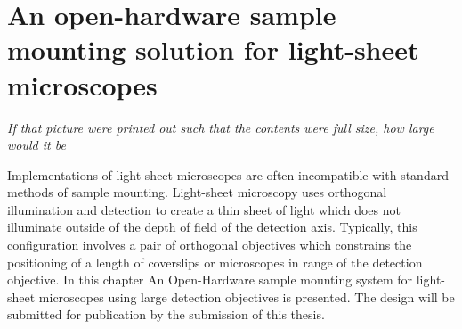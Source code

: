 \ifpdf
    \graphicspath{{Chapters/chamber/Figs/Raster/}{Chapters/chamber/Figs/PDF/}{Chapters/chamber/Figs/}}
\else
    \graphicspath{{Chapters/chamber/Figs/Vector/}{Chapters/chamber/Figs/}}
\fi


\chapter{An open-hardware sample mounting solution for light-sheet microscopes}\label{chapter:chamber}
\epigraph{\emph{If that picture were printed out such that the contents were full size, how large would it be}}{}

Implementations of light-sheet microscopes are often incompatible with standard methods of sample mounting.
Light-sheet microscopy uses orthogonal illumination and detection to create a thin sheet of light which does not illuminate outside of the depth of field of the detection axis.
Typically, this configuration involves a pair of orthogonal objectives which constrains the positioning of a length of coverslips or microscopes in range of the detection objective.
In this chapter An Open-Hardware sample mounting system for light-sheet microscopes using large detection objectives is presented.
The design will be submitted for publication by the submission of this thesis.

\pagebreak

